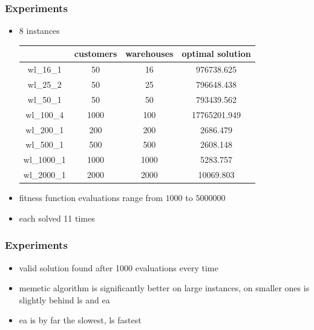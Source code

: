 \documentclass{beamer}
\begin{document}
\begin{frame}
    \frametitle{Experiments}
    \begin{itemize}
        \item 8 instances

    \begin{tabular}{ c | c | c | c }
        & customers & warehouses & optimal solution \\
        \hline
        wl\_16\_1   & 50 & 16 & 976738.625 \\
        wl\_25\_2   & 50 & 25 & 796648.438 \\
        wl\_50\_1   & 50 & 50 & 793439.562 \\
        wl\_100\_4  & 1000 & 100 & 17765201.949 \\
        wl\_200\_1  & 200 & 200 & 2686.479 \\
        wl\_500\_1  & 500 & 500 & 2608.148 \\
        wl\_1000\_1 & 1000 & 1000 & 5283.757 \\
        wl\_2000\_1 & 2000 & 2000 & 10069.803 \\
    \end{tabular}
        \item fitness function evaluations range from $1000$ to $5000000$
        \item each solved 11 times
    \end{itemize}
\end{frame}

\begin{frame}
    \frametitle{Experiments}
    \begin{itemize}
        \item valid solution found after 1000 evaluations every time
        \item memetic algorithm is significantly better on large instances, on smaller ones is slightly behind ls and ea
        \item ea is by far the slowest, ls fastest
    \end{itemize}
\end{frame}
\end{document}
